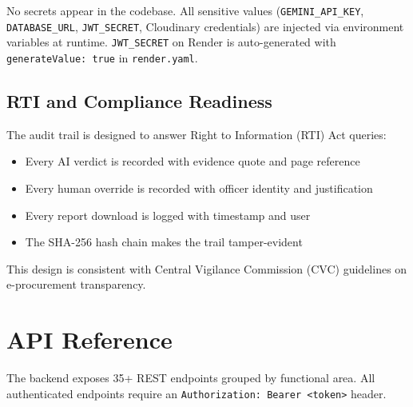 \documentclass[12pt,a4paper]{article}
\begin{document}
No secrets appear in the codebase. All sensitive values
(\texttt{GEMINI\_API\_KEY}, \texttt{DATABASE\_URL}, \texttt{JWT\_SECRET},
Cloudinary credentials) are injected via environment variables at runtime.
\texttt{JWT\_SECRET} on Render is auto-generated with \texttt{generateValue: true}
in \texttt{render.yaml}.

\subsection{RTI and Compliance Readiness}

The audit trail is designed to answer Right to Information (RTI) Act queries:
\begin{itemize}
\item Every AI verdict is recorded with evidence quote and page reference
\item Every human override is recorded with officer identity and justification
\item Every report download is logged with timestamp and user
\item The SHA-256 hash chain makes the trail tamper-evident
\end{itemize}

This design is consistent with Central Vigilance Commission (CVC) guidelines on
e-procurement transparency.

\section{API Reference}

The backend exposes 35+ REST endpoints grouped by functional area. All authenticated
endpoints require an \texttt{Authorization: Bearer <token>} header.
\end{document}

